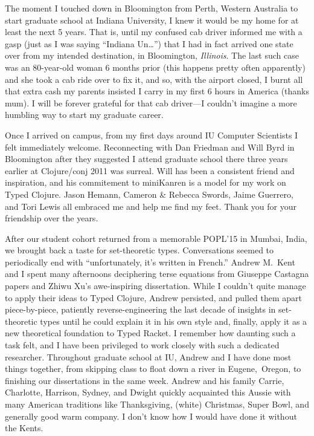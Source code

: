 The moment I touched down in Bloomington from Perth, Western Australia
to start graduate school at Indiana University,
I knew it would be my home for at least the next 5 years.
That is, until my confused cab driver informed me with a gasp
(just as I was saying ``Indiana Un\ldots'') that I had in fact arrived one
state over from my intended destination, in Bloomington, \emph{Illinois}.
The last such case was an 80-year-old woman 6 months prior (this happens pretty often apparently)
and she took a cab ride over to fix it, and so, with the airport closed,
I burnt all that extra cash my parents insisted I carry in my first
6 hours in America (thanks mum).
I will be forever grateful for that cab driver---I couldn't imagine a more
humbling way to start my graduate career.

Once I arrived on campus, from my first days around IU Computer Scientists
I felt immediately welcome.
Reconnecting with Dan Friedman and Will Byrd in Bloomington after they suggested
I attend graduate school there three years earlier at Clojure/conj 2011 was surreal.
Will has been a consistent friend and inspiration, and his commitement
to miniKanren is a model for my work on Typed Clojure.
Jason Hemann, Cameron \& Rebecca Swords, Jaime Guerrero, 
and Tori Lewis all embraced me and help me find my feet. Thank you
for your friendship over the years.

After our student cohort returned from a memorable POPL'15
in Mumbai, India, we brought back a taste for set-theoretic
types. Conversations seemed to periodically end with ``unfortunately, it's written in French.''
Andrew M.~Kent and I spent many afternoons deciphering 
terse equations from Giuseppe Castagna papers and
Zhiwu Xu's awe-inspiring dissertation.
While I couldn't quite manage to apply their ideas to Typed Clojure,
Andrew persisted, and pulled them apart piece-by-piece, patiently
reverse-engineering the last decade of insights in
set-theoretic types until he could explain it
in his own style and, finally, apply it as a new theoretical foundation
to Typed Racket. I remember how daunting such a task felt, and
I have been privileged to work closely with such a dedicated
researcher.
Throughout graduate school at IU, Andrew and I have done most things together,
from skipping class to float down a river in Eugene,~Oregon,
to finishing our dissertations in the same week.
Andrew and his family Carrie, Charlotte, Harrison, Sydney, and Dwight
quickly acquainted this Aussie with many American traditions like Thanksgiving,
(white) Christmas, Super Bowl, and generally good warm company. I don't know how I would
have done it without the Kents.

